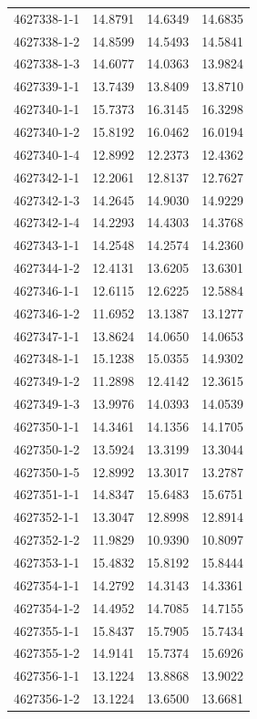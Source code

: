 \begin{longtable}{lrrr}
4627338-1-1 & 14.8791 & 14.6349 & 14.6835 \\
4627338-1-2 & 14.8599 & 14.5493 & 14.5841 \\
4627338-1-3 & 14.6077 & 14.0363 & 13.9824 \\
4627339-1-1 & 13.7439 & 13.8409 & 13.8710 \\
4627340-1-1 & 15.7373 & 16.3145 & 16.3298 \\
4627340-1-2 & 15.8192 & 16.0462 & 16.0194 \\
4627340-1-4 & 12.8992 & 12.2373 & 12.4362 \\
4627342-1-1 & 12.2061 & 12.8137 & 12.7627 \\
4627342-1-3 & 14.2645 & 14.9030 & 14.9229 \\
4627342-1-4 & 14.2293 & 14.4303 & 14.3768 \\
4627343-1-1 & 14.2548 & 14.2574 & 14.2360 \\
4627344-1-2 & 12.4131 & 13.6205 & 13.6301 \\
4627346-1-1 & 12.6115 & 12.6225 & 12.5884 \\
4627346-1-2 & 11.6952 & 13.1387 & 13.1277 \\
4627347-1-1 & 13.8624 & 14.0650 & 14.0653 \\
4627348-1-1 & 15.1238 & 15.0355 & 14.9302 \\
4627349-1-2 & 11.2898 & 12.4142 & 12.3615 \\
4627349-1-3 & 13.9976 & 14.0393 & 14.0539 \\
4627350-1-1 & 14.3461 & 14.1356 & 14.1705 \\
4627350-1-2 & 13.5924 & 13.3199 & 13.3044 \\
4627350-1-5 & 12.8992 & 13.3017 & 13.2787 \\
4627351-1-1 & 14.8347 & 15.6483 & 15.6751 \\
4627352-1-1 & 13.3047 & 12.8998 & 12.8914 \\
4627352-1-2 & 11.9829 & 10.9390 & 10.8097 \\
4627353-1-1 & 15.4832 & 15.8192 & 15.8444 \\
4627354-1-1 & 14.2792 & 14.3143 & 14.3361 \\
4627354-1-2 & 14.4952 & 14.7085 & 14.7155 \\
4627355-1-1 & 15.8437 & 15.7905 & 15.7434 \\
4627355-1-2 & 14.9141 & 15.7374 & 15.6926 \\
4627356-1-1 & 13.1224 & 13.8868 & 13.9022 \\
4627356-1-2 & 13.1224 & 13.6500 & 13.6681 \\

\end{longtable}

